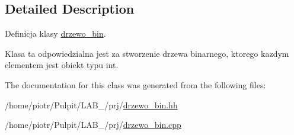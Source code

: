 \subsection{\-Detailed \-Description}
\-Definicja klasy \hyperlink{classdrzewo__bin}{drzewo\-\_\-bin}. 

\-Klasa ta odpowiedzialna jest za stworzenie drzewa binarnego, ktorego kazdym elementem jest obiekt typu int. 

\-The documentation for this class was generated from the following files\-:\begin{DoxyCompactItemize}
\item 
/home/piotr/\-Pulpit/\-L\-A\-B\-\_/prj/\hyperlink{drzewo__bin_8hh}{drzewo\-\_\-bin.\-hh}\item 
/home/piotr/\-Pulpit/\-L\-A\-B\-\_/prj/\hyperlink{drzewo__bin_8cpp}{drzewo\-\_\-bin.\-cpp}\end{DoxyCompactItemize}
